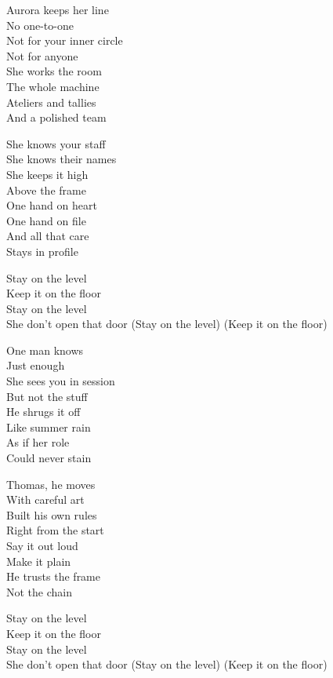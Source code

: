 \begin{lyrics}
Aurora keeps her line\\
No one-to-one\\
Not for your inner circle\\
Not for anyone\\
She works the room\\
The whole machine\\
Ateliers and tallies\\
And a polished team

She knows your staff\\
She knows their names\\
She keeps it high\\
Above the frame\\
One hand on heart\\
One hand on file\\
And all that care\\
Stays in profile

Stay on the level\\
Keep it on the floor\\
Stay on the level\\
She don't open that door
(Stay on the level)
(Keep it on the floor)

One man knows\\
Just enough\\
She sees you in session\\
But not the stuff\\
He shrugs it off\\
Like summer rain\\
As if her role\\
Could never stain

Thomas, he moves\\
With careful art\\
Built his own rules\\
Right from the start\\
Say it out loud\\
Make it plain\\
He trusts the frame\\
Not the chain

Stay on the level\\
Keep it on the floor\\
Stay on the level\\
She don't open that door
(Stay on the level)
(Keep it on the floor)


\end{lyrics}
